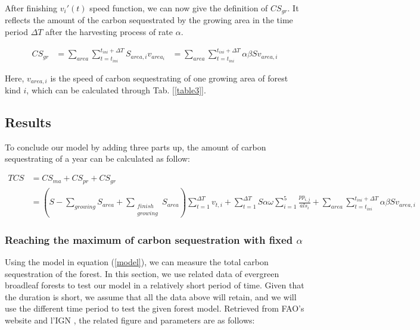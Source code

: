 After finishing $v_{i}'(t)$ speed function, we can now give the definition of $CS_{gr}$. It reflects the amount of the carbon sequestrated by the growing area in the time period $\Delta T$ after the harvesting process of rate $\alpha$.

\begin{equation}
    \begin{aligned}
            CS_{gr} &= \sum_{area}\sum_{t = t_{ini}}^{t_{ini} + \Delta T} {S_{area, i} v_{area_i}}
                    &= \sum_{area}\sum_{t = t_{ini}}^{t_{ini} + \Delta T} \alpha\beta S v_{area,i}
    \end{aligned}
\end{equation}

Here, $v_{area,i}$ is the speed of carbon sequestrating of one growing area of forest kind $i$, which can be calculated through Tab. [\ref{table3}].

\subsection{Results}
To conclude our model by adding three parts up, the amount of carbon sequestrating of a year can be calculated as follow:

\begin{equation}
    \begin{aligned}
       TCS  &= CS_{ma} + CS_{pr} + CS_{gr}\\
            &= (S-\sum_{growing}S_{area}+\sum_{\substack{finish \\ growing}}S_{area})\sum_{t=1}^{\Delta T}v_{t,i}
            + \sum_{t=1}^{\Delta T}S\alpha\omega\sum\limits _{i=1}^{5} \frac{pp_{i,j}}{als_i}
            + \sum_{area}\sum_{t = t_{ini}}^{t_{ini} + \Delta T} \alpha\beta S v_{area,i}
    \end{aligned}
    \label{model}
\end{equation}
\subsubsection{Reaching the maximum of carbon sequestration with fixed $\alpha$} \label{Reaching}
Using the model in equation (\ref{model}), we can measure the total carbon sequestration of the forest. 
In this section, we use related data of evergreen broadleaf forests to test our model in a relatively short period of time. Given that the duration is short, we assume that all the data above will retain, and we will use the different time period to test the given forest model. 
Retrieved from FAO's website \cite{7} and l’IGN \cite{8}, the related figure and parameters are as follows:

